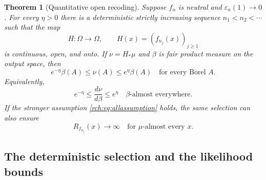 \documentclass[11pt]{article}
\newtheorem{theorem}{Theorem}[section]
\theoremstyle{definition}
\theoremstyle{remark}
\newcommand{\eps}{\varepsilon}
\begin{document}
\begin{theorem}[Quantitative open recoding]
\label{rch:thm:recoding}
Suppose \(f_n\) is neutral and \(\eps_n(1)\to0\). For every \(\eta>0\)
there is a deterministic strictly increasing sequence \(n_1<n_2<\cdots\)
such that the map
\begin{equation}
 H:\Omega\longrightarrow\Omega,
 \qquad H(x)=(f_{n_j}(x))_{j\ge1}
 \label{rch:eq:H}
\end{equation}
is continuous, open, and onto. If \(\nu=H_*\mu\) and \(\beta\) is fair
product measure on the output space, then
\begin{equation}
 e^{-\eta}\beta(A)\le\nu(A)\le e^\eta\beta(A)
 \quad\text{for every Borel }A.
 \label{rch:eq:boundedmeasure}
\end{equation}
Equivalently,
\begin{equation}
 e^{-\eta}\le\frac{d\nu}{d\beta}\le e^\eta
 \quad\beta\text{-almost everywhere}.
 \label{rch:eq:density}
\end{equation}
If the stronger assumption \eqref{rch:eq:allassumption} holds, the same selection
can also ensure
\begin{equation}
 R_{f_{n_j}}(x)\longrightarrow\infty
 \quad\text{for }\mu\text{-almost every }x.
 \label{rch:eq:radiusdiverge}
\end{equation}
\end{theorem}

\subsection{The deterministic selection and the likelihood bounds}
\end{document}

